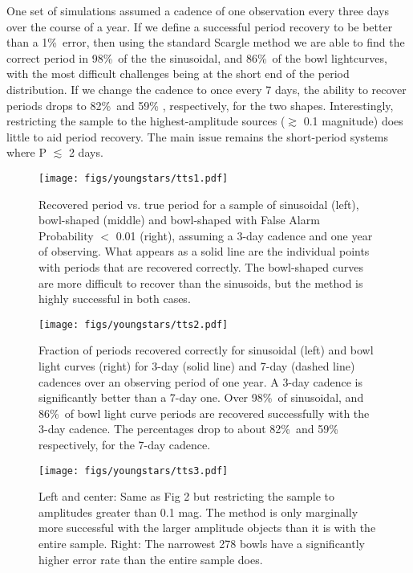 One set of simulations assumed a cadence of
one observation every three days over the course of a year.
If we define a successful period recovery to be better than a 1\%\ error, then
using the standard Scargle method \citep[(Horne \& Baliunas 1986)]{Scargle}
we are able to find the correct period in
98\%\ of the the sinusoidal, and 86\%\ of the bowl lightcurves, with the most
difficult challenges being at the short end of the period distribution. If we change
the cadence to once every 7 days, the ability to recover periods drops to
82\%\ and 59\% , respectively, for the two shapes. Interestingly, restricting the
sample to the highest-amplitude sources ($\gtrsim$ 0.1 magnitude) does little
to aid period recovery. The main issue remains the short-period systems where
P $\lesssim$ 2 days. 

\begin{figure}[b]
\begin{center}
 \texttt{[image: figs/youngstars/tts1.pdf]}
 \caption{Recovered period vs. true period for a sample of sinusoidal (left),
bowl-shaped (middle) and bowl-shaped with False Alarm Probability $<$ 0.01 (right),
assuming a 3-day cadence and one year of observing. What appears as a solid line are the
individual points with periods that are recovered correctly. The bowl-shaped curves are
more difficult to recover than the sinusoids, but the method is highly successful in both cases.}
   \label{tts1}
\end{center}
\end{figure}

\begin{figure}[b]
\vspace*{1.0 cm}
\begin{center}
 \texttt{[image: figs/youngstars/tts2.pdf]}
 \caption{ Fraction of periods recovered correctly for sinusoidal (left) and bowl light curves (right) for
3-day (solid line) and 7-day (dashed line) cadences over an observing period of one year.
A 3-day cadence is significantly better than a 7-day one. Over 98\%\ of sinusoidal, and 86\%\ of bowl
light curve periods are recovered successfully with the 3-day cadence. The percentages drop to about
82\%\ and 59\%\, respectively, for the 7-day cadence.
}
   \label{tts2}
\end{center}
\end{figure}

\begin{figure}[b]
\vspace*{1.0 cm}
\begin{center}
 \texttt{[image: figs/youngstars/tts3.pdf]}
 \caption{Left and center: Same as Fig 2 but restricting the sample to amplitudes greater than 0.1 mag. The
method is only marginally more successful with the larger amplitude objects than it is with the entire sample.
Right: The narrowest 278 bowls have a significantly higher error rate than the entire sample does.
}
   \label{tts3}
\end{center}
\end{figure}

